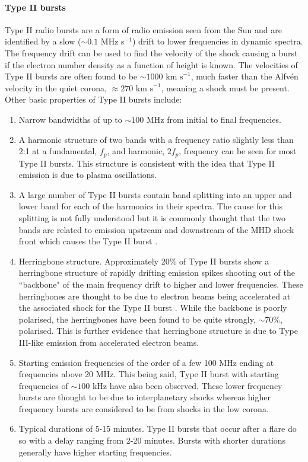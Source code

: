 \paragraph{Type II bursts}
Type II radio bursts are a form of radio emission seen from the Sun and are identified by a slow ($\sim 0.1$ MHz s$^{-1}$) drift to lower frequencies in dynamic spectra. The frequency drift can be used to find the velocity of the shock causing a burst if the electron number density as a function of height is known. The velocities of Type II bursts are often found to be $\sim 1000 \mbox{ km s}^{-1}$, much faster than the Alfv\'{e}n velocity in the quiet corona, $\approx 270 \mbox{ km s}^{-1}$, meaning a shock must be present. Other basic properties of Type II bursts include:
\begin{enumerate}
    \item Narrow bandwidths of up to $\sim 100$ MHz from initial to final frequencies.
    \item A harmonic structure of two bands with a frequency ratio slightly less than 2:1 at a fundamental, $f_p$, and harmonic, $2f_p$, frequency can be seen for most Type II bursts. This structure is consistent with the idea that Type II emission is due to plasma oscillations.
    \item A large number of Type II bursts contain band splitting into an upper and lower band for each of the harmonics in their spectra. The cause for this splitting is not fully understood but it is commonly thought that the two bands are related to emission upstream and downstream of the MHD shock front which causes the Type II burst \citep{Smerd1974,NelsonandMelrose1985, Vrsnak2002}.
    \item Herringbone structure. Approximately 20\% of Type II bursts show a herringbone structure of rapidly drifting emission spikes shooting out of the ``backbone" of the main frequency drift to higher and lower frequencies. These herringbones are thought to be due to electron beams being accelerated at the associated shock for the Type II burst \citep{Mann1995}. While the backbone is poorly polarised, the herringbones have been found to be quite strongly, $\sim 70\%$, polarised. This is further evidence that herringbone structure is due to Type III-like emission from accelerated electron beams.
    \item Starting emission frequencies of the order of a few 100 MHz ending at frequencies above 20 MHz. This being said, Type II burst with starting frequencies of $\sim 100$ kHz have also been observed. 
    These lower frequency bursts are thought to be due to interplanetary shocks whereas higher frequency bursts are considered to be from shocks in the low corona.
    \item Typical durations of 5-15 minutes. Type II bursts that occur after a flare do so with a delay ranging from 2-20 minutes. Bursts with shorter durations generally have higher starting frequencies. %
\end{enumerate}
 
